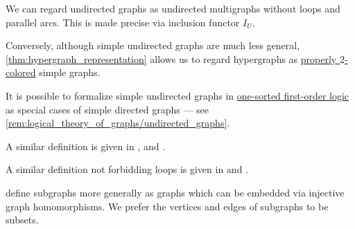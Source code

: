 \begin{comments}
  \item We can regard undirected graphs as undirected multigraphs without loops and parallel arcs. This is made precise via inclusion functor \hyperref[def:graph_functors/undirected_inclusion]{\( I_U \)}.

  Conversely, although simple undirected graphs are much less general, \cref{thm:hypergraph_representation} allows us to regard hypergraphs as \hyperref[def:graph_coloring/proper]{properly \( 2 \)-colored} simple graphs.

  \item It is possible to formalize simple undirected graphs in \hyperref[def:first_order_logic]{one-sorted first-order logic} as special cases of simple directed graphs --- see \cref{rem:logical_theory_of_graphs/undirected_graphs}.

  \item A similar definition is given in
  \cite[9]{Harary1969GraphTheory},
  \cite[2]{Diestel2017GraphTheory} and
  \cite[1]{Bollobás1998ModernGraphTheory}.

  A similar definition not forbidding loops is given in
  \cite[def. 10.1.1]{Rosen2019DiscreteMathematics} and
  \cite[def. 1.1.2]{Knauer2019AlgebraicGraphTheory}.

  \item \Textcite[def. 1.4.8]{Knauer2019AlgebraicGraphTheory} define subgraphs more generally as graphs which can be embedded via injective graph homomorphisms. We prefer the vertices and edges of subgraphs to be subsets.
\end{comments}


